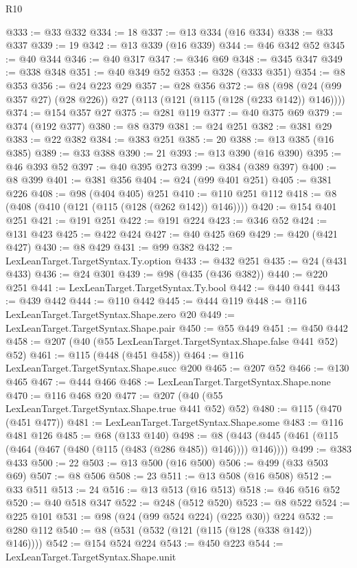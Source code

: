 \begin{lexlean}{R10}
\begin{coremodule}
@333 := @33 @332
@334 := 18
@337 := @13 @334 (@16 @334)
@338 := @33 @337
@339 := 19
@342 := @13 @339 (@16 @339)
@344 := @46 @342 @52
@345 := @40 @344
@346 := @40 @317
@347 := @346 @69
@348 := @345 @347
@349 := @338 @348
@351 := @40 @349 @52
@353 := @328 (@333 @351)
@354 := @8 @353
@356 := @24 @223 @29
@357 := @28 @356
@372 := @8 (@98 (@24 (@99 @357 @27) (@28 @226)) @27 (@113 (@121 (@115 (@128 (@233 @142)) @146))))
@374 := @154 @357 @27
@375 := @281 @119
@377 := @40 @375 @69
@379 := @374 (@192 @377)
@380 := @8 @379
@381 := @24 @251
@382 := @381 @29
@383 := @22 @382
@384 := @383 @251
@385 := 20
@388 := @13 @385 (@16 @385)
@389 := @33 @388
@390 := 21
@393 := @13 @390 (@16 @390)
@395 := @46 @393 @52
@397 := @40 @395 @273
@399 := @384 (@389 @397)
@400 := @8 @399
@401 := @381 @356
@404 := @24 (@99 @401 @251)
@405 := @381 @226
@408 := @98 (@404 @405) @251
@410 := @110 @251 @112
@418 := @8 (@408 (@410 (@121 (@115 (@128 (@262 @142)) @146))))
@420 := @154 @401 @251
@421 := @191 @251
@422 := @191 @224
@423 := @346 @52
@424 := @131 @423
@425 := @422 @424
@427 := @40 @425 @69
@429 := @420 (@421 @427)
@430 := @8 @429
@431 := @99 @382
@432 := LexLeanTarget.TargetSyntax.Ty.option
@433 := @432 @251
@435 := @24 (@431 @433)
@436 := @24 @301
@439 := @98 (@435 (@436 @382))
@440 := @220 @251
@441 := LexLeanTarget.TargetSyntax.Ty.bool
@442 := @440 @441
@443 := @439 @442
@444 := @110 @442
@445 := @444 @119
@448 := @116 LexLeanTarget.TargetSyntax.Shape.zero @20
@449 := LexLeanTarget.TargetSyntax.Shape.pair
@450 := @55 @449
@451 := @450 @442
@458 := @207 (@40 (@55 LexLeanTarget.TargetSyntax.Shape.false @441 @52) @52)
@461 := @115 (@448 (@451 @458))
@464 := @116 LexLeanTarget.TargetSyntax.Shape.succ @200
@465 := @207 @52
@466 := @130 @465
@467 := @444 @466
@468 := LexLeanTarget.TargetSyntax.Shape.none
@470 := @116 @468 @20
@477 := @207 (@40 (@55 LexLeanTarget.TargetSyntax.Shape.true @441 @52) @52)
@480 := @115 (@470 (@451 @477))
@481 := LexLeanTarget.TargetSyntax.Shape.some
@483 := @116 @481 @126
@485 := @68 (@133 @140)
@498 := @8 (@443 (@445 (@461 (@115 (@464 (@467 (@480 (@115 (@483 (@286 @485)) @146)))) @146))))
@499 := @383 @433
@500 := 22
@503 := @13 @500 (@16 @500)
@506 := @499 (@33 @503 @69)
@507 := @8 @506
@508 := 23
@511 := @13 @508 (@16 @508)
@512 := @33 @511
@513 := 24
@516 := @13 @513 (@16 @513)
@518 := @46 @516 @52
@520 := @40 @518 @347
@522 := @248 (@512 @520)
@523 := @8 @522
@524 := @225 @101
@531 := @98 (@24 (@99 @524 @224) (@225 @30)) @224
@532 := @280 @112
@540 := @8 (@531 (@532 (@121 (@115 (@128 (@338 @142)) @146))))
@542 := @154 @524 @224
@543 := @450 @223
@544 := LexLeanTarget.TargetSyntax.Shape.unit

\end{coremodule}
\end{lexlean}

